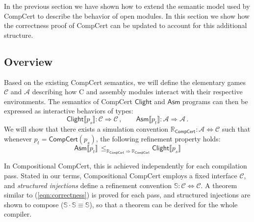 \documentclass[acmsmall,timestamp,review,anonymous]{acmart}
\newcommand{\kw}[1]{\ensuremath{ \mathsf{#1} }}
\begin{document}
In the previous section
we have shown how to extend
the semantic model used by CompCert
to describe the behavior of open modules.
In this section
we show how the correctness proof of CompCert
can be updated to account for this additional structure.

\subsection{Overview} \label{sec:compcert:overview} %

Based on the existing CompCert semantics,
we will define the elementary games
$\mathcal{C}$ and $\mathcal{A}$
describing how C and assembly modules
interact with their respective environments.
The semantics of CompCert $\kw{Clight}$ and $\kw{Asm}$ programs
can then be expressed as interactive behaviors of types:
\[
    \kw{Clight} \llbracket p_s \rrbracket :
      \mathcal{C} \Rightarrow \mathcal{C} \,, \qquad
    \kw{Asm} \llbracket p_t \rrbracket :
      \mathcal{A} \Rightarrow \mathcal{A} \,.
\]
We will show that there exists a simulation convention
$\mathbb{R}_\kw{CompCert} : \mathcal{A} \Leftrightarrow \mathcal{C}$
such that whenever $p_t = \kw{CompCert}(p_s)$,
the following refinement property holds:
\begin{equation}
    \label{eqn:correctness}
    \kw{Asm} \llbracket p_t \rrbracket \,
    \le_{\mathbb{R}_\kw{CompCert} \Rightarrow \mathbb{R}_\kw{CompCert}}
    \kw{Clight} \llbracket p_s \rrbracket
\end{equation}

In Compositional CompCert,
this is achieved independently for each compilation pass.
Stated in our terms,
Compositional CompCert
employs a fixed interface $\mathcal{C}$,
and \emph{structured injections} define a refinement convention
$\mathbb{S} : \mathcal{C} \Leftrightarrow \mathcal{C}$.
A theorem similar to (\ref{eqn:correctness}) is proved for each pass,
and structured injections are shown to compose
($\mathbb{S} \cdot \mathbb{S} \equiv \mathbb{S}$),
so that a theorem can be derived for the whole compiler.

\end{document}
